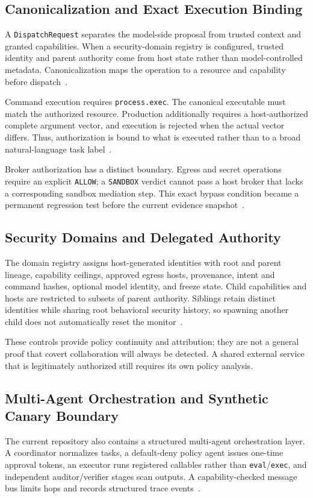 \documentclass[journal]{IEEEtran}
\begin{document}
\subsection{Canonicalization and Exact Execution Binding}
A \texttt{DispatchRequest} separates the model-side proposal from trusted context and granted capabilities. When a security-domain registry is configured, trusted identity and parent authority come from host state rather than model-controlled metadata. Canonicalization maps the operation to a resource and capability before dispatch~\cite{BULL_Dispatcher}.

Command execution requires \texttt{process.exec}. The canonical executable must match the authorized resource. Production additionally requires a host-authorized complete argument vector, and execution is rejected when the actual vector differs. Thus, authorization is bound to what is executed rather than to a broad natural-language task label~\cite{BULL_Dispatcher}.

Broker authorization has a distinct boundary. Egress and secret operations require an explicit \texttt{ALLOW}; a \texttt{SANDBOX} verdict cannot pass a host broker that lacks a corresponding sandbox mediation step. This exact bypass condition became a permanent regression test before the current evidence snapshot~\cite{BULL_Dispatcher,BULL_CurrentMain}.

\subsection{Security Domains and Delegated Authority}
The domain registry assigns host-generated identities with root and parent lineage, capability ceilings, approved egress hosts, provenance, intent and command hashes, optional model identity, and freeze state. Child capabilities and hosts are restricted to subsets of parent authority. Siblings retain distinct identities while sharing root behavioral security history, so spawning another child does not automatically reset the monitor~\cite{BULL_SecurityDomain}.

These controls provide policy continuity and attribution; they are not a general proof that covert collaboration will always be detected. A shared external service that is legitimately authorized still requires its own policy analysis.

\subsection{Multi-Agent Orchestration and Synthetic Canary Boundary}
The current repository also contains a structured multi-agent orchestration layer. A coordinator normalizes tasks, a default-deny policy agent issues one-time approval tokens, an executor runs registered callables rather than \texttt{eval}/\texttt{exec}, and independent auditor/verifier stages scan outputs. A capability-checked message bus limits hops and records structured trace events~\cite{BULL_MultiAgent}.
\end{document}
